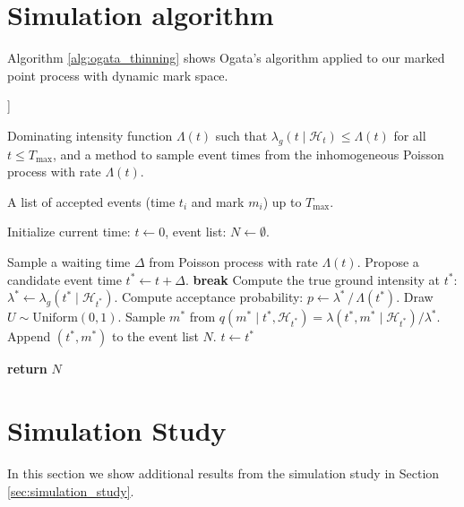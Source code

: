 \documentclass[12pt]{article}
\begin{document}
\section{Simulation algorithm}\label{sec:sim_algorithm}

Algorithm \ref{alg:ogata_thinning} shows Ogata's \cite{ogata1981lewis} algorithm applied to our marked point process with dynamic mark space.

\begin{algorithm}[[H]]
\caption{Ogata's Thinning Algorithm for HawkesNet}
\label{alg:ogata_thinning}
\begin{algorithmic}[1]

\REQUIRE Dominating intensity function $\Lambda(t)$ such that
$\lambda_g(t \mid \mathcal{H}_t) \leq \Lambda(t)$ for all $t \leq T_{\max}$, and a method to sample event times from the inhomogeneous Poisson process with rate $\Lambda(t)$.

\ENSURE A list of accepted events (time $t_i$ and mark $m_i$) up to $T_{\max}$.

\STATE Initialize current time: $t \gets 0$, event list: $ N \gets \emptyset$.

    \STATE Sample a waiting time $\Delta$ from Poisson process with rate $\Lambda(t)$.
    \STATE Propose a candidate event time $t^* \gets t + \Delta$.
        \STATE \textbf{break}
    \ENDIF
    \STATE Compute the true ground intensity at $t^*$: $\lambda^* \gets \lambda_g(t^* \mid \mathcal{H}_{t^*})$.
    \STATE Compute acceptance probability: $p \gets \lambda^* \,/\, \Lambda(t^*)$.
    \STATE Draw $U \sim \mathrm{Uniform}(0,1)$.
        \STATE Sample $m^*$ from $q(m^*\mid t^*,\mathcal H_{t^*})=\lambda(t^*,m^*\mid\mathcal H_{t^*})/\lambda^*$.
        \STATE Append $(t^*,m^*)$ to the event list $ N$.
    \ENDIF
    \STATE $t \gets t^*$
\ENDWHILE

\STATE \textbf{return} $ N$

\end{algorithmic}
\end{algorithm}


\section{Simulation Study}\label{app:sim_study_extra}

In this section we show additional results from the simulation study in Section \ref{sec:simulation_study}.
\end{document}
